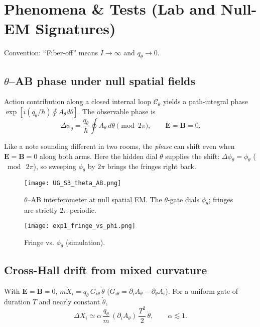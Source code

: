 \section{Phenomena \& Tests (Lab and Null-EM Signatures)}\label{sec:phenomenology}

Convention: “Fiber-off” means $I\to\infty$ and $q_\theta\to 0$.

\subsection{\texorpdfstring{$\theta$}{theta}--AB phase under null spatial fields}\label{sec:theta-ab}
Action contribution along a closed internal loop $\mathcal C_\theta$ yields a path-integral phase $\exp[i(q_\theta/\hbar)\oint A_\theta d\theta]$. The observable phase is
\begin{equation}
 \Delta\phi_\theta = \frac{q_\theta}{\hbar}\oint A_\theta\,d\theta \pmod{2\pi},\qquad \bm E=\bm B=0.
\end{equation}

\begin{idea}
Like a note sounding different in two rooms, the \emph{phase} can shift even when $\mathbf{E}=\mathbf{B}=0$ along both arms. Here the hidden dial $\theta$ supplies the shift: $\Delta\phi_\theta=\phi_\theta$ (\(\bmod\ 2\pi\)), so sweeping $\phi_\theta$ by $2\pi$ brings the fringes right back.
\end{idea}

\begin{figure}[h]
  \centering
  \texttt{[image: UG\_S3\_theta\_AB.png]}
  \caption{$\theta$--AB interferometer at null spatial EM. The $\theta$-gate dials $\phi_\theta$; fringes are strictly $2\pi$-periodic.}
  \label{fig:theta-ab-cartoon}
\end{figure}

\begin{figure}[h]
  \centering
  \texttt{[image: exp1\_fringe\_vs\_phi.png]}
  \caption{Fringe vs. $\phi_\theta$ (simulation).}
  \label{fig:theta-ab-fringe}
\end{figure}


\subsection{Cross-Hall drift from mixed curvature}\label{sec:cross-hall}
With $\bm E=\bm B=0$, $m\ddot X_i = q_\theta\,G_{i\theta}\,\dot\theta$ ($G_{i\theta}=\partial_iA_\theta-\partial_\theta A_i$). For a uniform gate of duration $T$ and nearly constant $\dot\theta$,
\begin{equation}
 \Delta X_i \simeq \alpha\,\frac{q_\theta}{m}\,(\partial_iA_\theta)\,\frac{T^2}{2}\,\dot\theta,\qquad \alpha\lesssim 1.
\end{equation}


